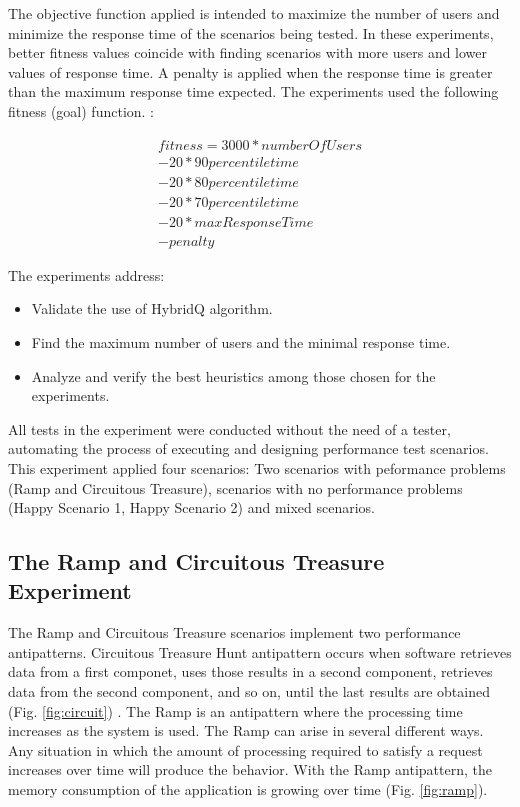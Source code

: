 \documentclass{bmcart}
\begin{document}
The objective function applied is intended to maximize the number of users and minimize the response time of the scenarios being tested.  In these experiments, better fitness values coincide with finding scenarios with more users and lower values of response time. A penalty is applied when the response time is greater than the  maximum response time expected. The experiments used the following fitness (goal) function. :

\begin{equation}
\begin{aligned}
fitness=3000*numberOfUsers\\
-20* 90percentiletime\\
-20*80percentiletime\\
-20*70percentiletime\\
-20*maxResponseTime\\
-penalty
\end{aligned}
\end{equation}

The experiments address:

\begin{itemize}
\item Validate the use of HybridQ algorithm.
\item Find the maximum number of users and the minimal response time.
\item Analyze and verify the best heuristics among those chosen for the experiments.
\end{itemize}




All tests in the experiment were conducted without the need of a tester, automating the process of executing and designing performance test scenarios. This experiment applied four scenarios: Two scenarios with peformance problems (Ramp and Circuitous Treasure), scenarios with no performance problems (Happy Scenario 1, Happy Scenario 2) and mixed scenarios. 

\subsection{The Ramp and Circuitous Treasure Experiment}

The Ramp and Circuitous Treasure scenarios implement two performance antipatterns.  Circuitous Treasure Hunt antipattern occurs when software retrieves data from a first componet, uses those results in a second component, retrieves data from the second component, and so on, until the last results are obtained (Fig. \ref{fig:circuit})  \citep{Smith2002} \citep{Smith2003}. The Ramp is an antipattern where the processing time increases as the system is used. The Ramp can arise in several different ways. Any situation in which the amount of processing required to satisfy a request increases over time will produce the behavior. With the Ramp antipattern, the memory consumption of the application is growing over time (Fig. \ref{fig:ramp}). 
\end{document}
